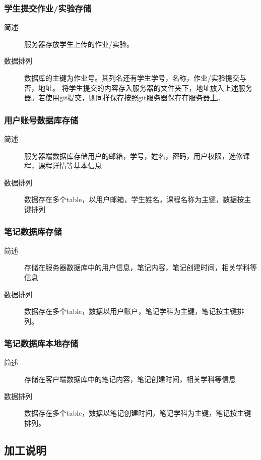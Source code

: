 \subsubsection{学生提交作业/实验存储}
\begin{description}
  \item[简述] 服务器存放学生上传的作业/实验。
  \item[数据排列]数据库的主键为作业号。其列名还有学生学号，名称，作业/实验提交与否，地址。
  将学生提交的内容存入服务器的文件夹下，地址放入上述服务器。若使用git提交，则同样保存按照git服务器保存在服务器上。
\end{description}

\subsubsection{用户账号数据库存储}
\begin{description}
  \item[简述]服务器端数据库存储用户的邮箱，学号，姓名，密码，用户权限，选修课程，课程详情等基本信息
  \item[数据排列]数据存在多个table，以用户邮箱，学生姓名，课程名称为主键，数据按主键排列
\end{description}

\subsubsection{笔记数据库存储}
\begin{description}
\item[简述]存储在服务器数据库中的用户信息，笔记内容，笔记创建时间，相关学科等信息
\item[数据排列]数据存在多个table，数据以用户账户，笔记学科为主键，笔记按主键排列。
\end{description}

\subsubsection{笔记数据库本地存储}
\begin{description}
\item[简述] 存储在客户端数据库中的笔记内容，笔记创建时间，相关学科等信息
\item[数据排列] 数据存在多个table，数据以笔记创建时间，笔记学科为主键，笔记按主键排列。
\end{description}






\subsection{加工说明}
